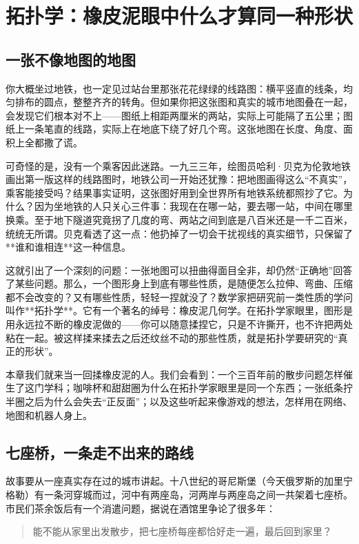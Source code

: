 \chapter{拓扑学：橡皮泥眼中什么才算同一种形状}

\section{一张不像地图的地图}

你大概坐过地铁，也一定见过站台里那张花花绿绿的线路图：横平竖直的线条，均匀排布的圆点，整整齐齐的转角。但如果你把这张图和真实的城市地图叠在一起，会发现它们根本对不上——图纸上相距两厘米的两站，实际上可能隔了五公里；图纸上一条笔直的线路，实际上在地底下绕了好几个弯。这张地图在长度、角度、面积上全都撒了谎。

可奇怪的是，没有一个乘客因此迷路。一九三三年，绘图员哈利·贝克为伦敦地铁画出第一版这样的线路图时，地铁公司一开始还犹豫：把地图画得这么“不真实”，乘客能接受吗？结果事实证明，这张图好用到全世界所有地铁系统都照抄了它。为什么？因为坐地铁的人只关心三件事：我现在在哪一站，要去哪一站，中间在哪里换乘。至于地下隧道究竟拐了几度的弯、两站之间到底是八百米还是一千二百米，统统无所谓。贝克看透了这一点：他扔掉了一切会干扰视线的真实细节，只保留了**谁和谁相连**这一种信息。

这就引出了一个深刻的问题：一张地图可以扭曲得面目全非，却仍然“正确地”回答了某些问题。那么，一个图形身上到底有哪些性质，是随便怎么拉伸、弯曲、压缩都不会改变的？又有哪些性质，轻轻一捏就没了？数学家把研究前一类性质的学问叫作**拓扑学**。它有一个著名的绰号：橡皮泥几何学。在拓扑学家眼里，图形是用永远拉不断的橡皮泥做的——你可以随意揉捏它，只是不许撕开，也不许把两处粘在一起。被这样揉来揉去之后还纹丝不动的那些性质，就是拓扑学要研究的“真正的形状”。

本章我们就来当一回揉橡皮泥的人。我们会看到：一个三百年前的散步问题怎样催生了这门学科；咖啡杯和甜甜圈为什么在拓扑学家眼里是同一个东西；一张纸条拧半圈之后为什么会失去“正反面”；以及这些听起来像游戏的想法，怎样用在网络、地图和机器人身上。

\section{七座桥，一条走不出来的路线}

故事要从一座真实存在过的城市讲起。十八世纪的哥尼斯堡（今天俄罗斯的加里宁格勒）有一条河穿城而过，河中有两座岛，河两岸与两座岛之间一共架着七座桥。市民们茶余饭后有一个消遣问题，据说在酒馆里争论了很多年：

\begin{quote}
能不能从家里出发散步，把七座桥每座都恰好走一遍，最后回到家里？
\end{quote}


